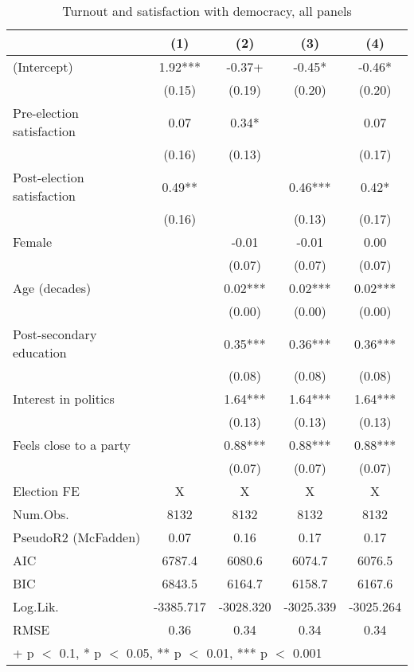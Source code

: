 \begin{table}

\caption{\label{tab:unnamed-chunk-3}Turnout and satisfaction with democracy, all panels}
\centering
\begin{tabular}[t]{lcccc}
\toprule
  & (1) & (2) & (3) & (4)\\
\midrule
(Intercept) & 1.92*** & -0.37+ & -0.45* & -0.46*\\
 & (0.15) & (0.19) & (0.20) & (0.20)\\
Pre-election satisfaction & 0.07 & 0.34* &  & 0.07\\
 & (0.16) & (0.13) &  & (0.17)\\
Post-election satisfaction & 0.49** &  & 0.46*** & 0.42*\\
 & (0.16) &  & (0.13) & (0.17)\\
Female &  & -0.01 & -0.01 & 0.00\\
 &  & (0.07) & (0.07) & \vphantom{1} (0.07)\\
Age (decades) &  & 0.02*** & 0.02*** & 0.02***\\
 &  & (0.00) & (0.00) & (0.00)\\
Post-secondary education &  & 0.35*** & 0.36*** & 0.36***\\
 &  & (0.08) & (0.08) & (0.08)\\
Interest in politics &  & 1.64*** & 1.64*** & 1.64***\\
 &  & (0.13) & (0.13) & (0.13)\\
Feels close to a party &  & 0.88*** & 0.88*** & 0.88***\\
 &  & (0.07) & (0.07) & (0.07)\\
\midrule
Election FE & X & X & X & X\\
Num.Obs. & 8132 & 8132 & 8132 & 8132\\
PseudoR2 (McFadden) & 0.07 & 0.16 & 0.17 & 0.17\\
AIC & 6787.4 & 6080.6 & 6074.7 & 6076.5\\
BIC & 6843.5 & 6164.7 & 6158.7 & 6167.6\\
Log.Lik. & -3385.717 & -3028.320 & -3025.339 & -3025.264\\
RMSE & 0.36 & 0.34 & 0.34 & 0.34\\
\bottomrule
\multicolumn{5}{l}{\rule{0pt}{1em}+ p $<$ 0.1, * p $<$ 0.05, ** p $<$ 0.01, *** p $<$ 0.001}\\
\end{tabular}
\end{table}
